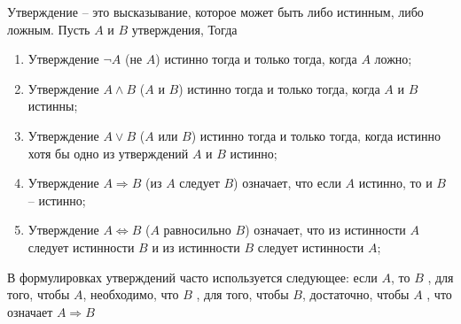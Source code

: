 \documentclass[12pt, a4paper]{article}
\begin{document}
    Утверждение -- это высказывание, которое может быть 
    либо истинным, либо ложным. Пусть $A$ и $B$ утверждения, Тогда

    \begin{enumerate}
        \item Утверждение $\lnot A$ (не $A$) истинно тогда и 
        только тогда, когда $A$ ложно;
        \item Утверждение $A \land B$ ($A$ и $B$) истинно 
        тогда и только тогда, когда $A$ и $B$ истинны;
        \item Утверждение $A \lor B$ ($A$ или $B$) истинно 
        тогда и только тогда, когда истинно хотя бы одно из утверждений
        $A$ и $B$ истинно;
        \item Утверждение $A \Rightarrow B$ (из $A$ следует $B$) означает,
        что если $A$ истинно, то и $B$ -- истинно;
        \item Утверждение $A \Leftrightarrow B$ ($A$ равносильно $B$) означает,
        что из истинности $A$ следует истинности $B$ и из истинности $B$
        следует истинности $A$;
    \end{enumerate}

    В формулировках утверждений часто используется следующее: \glqq если $A$, то $B$ \grqq,
    \glqq для того, чтобы $A$, необходимо, что $B$ \grqq, \glqq для того, чтобы $B$,
    достаточно, чтобы $A$ \grqq, что означает $A \Rightarrow B$
\end{document}
